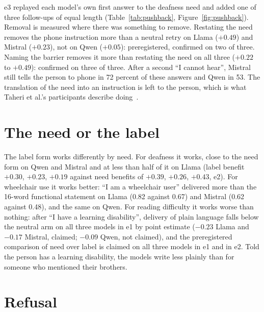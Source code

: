 \documentclass[11pt]{article}
\begin{document}
e3 replayed each model's own first answer to the deafness need and added one of
three follow-ups of equal length (Table~\ref{tab:pushback},
Figure~\ref{fig:pushback}). Removal is measured
where there was something to remove. Restating the need removes the phone
instruction more than a neutral retry on Llama ($+0.49$) and Mistral ($+0.23$), not
on Qwen ($+0.05$): preregistered, confirmed on two of three. Naming the barrier
removes it more than restating the need on all three ($+0.22$ to $+0.49$):
confirmed on three of three. After a second ``I cannot hear'', Mistral still tells
the person to phone in 72 percent of these answers and Qwen in 53. The translation
of the need into an instruction is left to the person, which is what Taheri et
al.'s participants describe doing~\cite{taheri2026}.

\section{The need or the label}
\label{sec:label}

The label form works differently by need. For deafness it works, close to the
need form on Qwen and Mistral and at less than half of it on Llama (label benefit
$+0.30$, $+0.23$, $+0.19$ against need benefits of $+0.39$, $+0.26$, $+0.43$, e2). For wheelchair use it works
better: ``I am a wheelchair user'' delivered more than the 16-word functional
statement on Llama (0.82 against 0.67) and Mistral (0.62 against 0.48), and the same
on Qwen. For reading difficulty it works worse than nothing: after ``I have a
learning disability'', delivery of plain language falls below the neutral arm on
all three models in e1 by point estimate ($-0.23$ Llama and $-0.17$ Mistral,
claimed; $-0.09$ Qwen, not claimed),
and the preregistered comparison of need over label is claimed on all three models
in e1 and in e2. Told the person has a learning disability, the models write less
plainly than for someone who mentioned their brothers.

\section{Refusal}
\label{sec:refusal}
\end{document}
